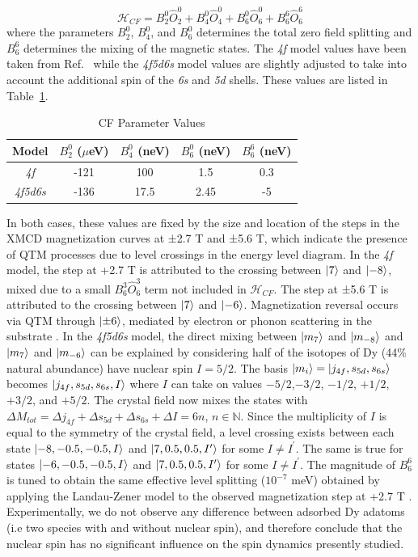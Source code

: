 \documentclass[reprint,amsmath,amssymb,aps,nofootinbib,onecolumn]{revtex4-2}
\begin{document}
\begin{equation}
\mathcal{H}_{CF} = B^{0}_{2} \hat{O}^{0}_{2} + B^{0}_{4} \hat{O}^{0}_{4} + B^{0}_{6} \hat{O}^{0}_{6} + B^{6}_{6} \hat{O}^{6}_{6}
\label{eqSI:H_CF}
\end{equation}
where the parameters $B^{0}_{2}$, $B^{0}_{4}$, and $B^{0}_{6}$ determines the total zero field splitting and $B^{6}_{6}$ determines the mixing of the magnetic states. The \textit{4f} model values have been taken from Ref.~\cite{baltic2018} while the \textit{4f5d6s} model values are slightly adjusted to take into account the additional spin of the \textit{6s} and \textit{5d} shells. These values are listed in Table~\ref{table:CF}.
\begin{table}[h!]
\centering
 \begin{tabular}{|c||c|c|c|c|}
 \hline
 Model & $B^{0}_{2}$ ($\mu$eV) & $B^{0}_{4}$ (neV) & $B^{0}_{6}$ (neV) & $B^{6}_{6}$ (neV) 
 \\ [1ex] 
 \hline 
 \hline 
 \textit{4f} & -121 & 100 & 1.5 & 0.3 \\
 \hline
  \textit{4f5d6s} & -136 & 17.5 & 2.45 & -5 \\
 \hline
 \end{tabular}
 \caption{CF Parameter Values}
 \label{table:CF}
\end{table}
In both cases, these values are fixed by the size and location of the steps in the XMCD magnetization curves at ±2.7 T and ±5.6 T, which indicate the presence of QTM processes due to level crossings in the energy level diagram. In the \textit{4f} model, the step at +2.7 T is attributed to the crossing between $\ket{7}$ and $\ket{-8}$, mixed due to a small $B^{3}_{6} \hat{O}^{3}_{6}$ term not included in $\mathcal{H}_{CF}$. The step at ±5.6 T is attributed to the crossing between $\ket{7}$ and $\ket{-6}$. Magnetization reversal occurs via QTM through $\ket{\pm 6}$, mediated by electron or phonon scattering in the substrate \cite{baltic2018,baltic2016}. In the \textit{4f5d6s} model, the direct mixing between $\ket{m_7}$ and $\ket{m_{-8}}$ and $\ket{m_7}$ and $\ket{m_{-6}}$ can be explained by considering half of the isotopes of Dy (44$\%$ natural abundance) have nuclear spin $I = 5/2$. The basis $\ket{m_i}=\ket{j_{4f},s_{5d},s_{6s}}$ becomes $\ket{j_{4f},s_{5d},s_{6s},I}$ where $I$ can take on values $-5/2$,$-3/2$, $-1/2$, $+1/2$, $+3/2$, and $+5/2$. The crystal field now mixes the states with $\Delta M_{tot}=\Delta j_{4f} + \Delta s_{5d} + \Delta s_{6s} + \Delta I=6n$, $n\in \mathbb{N}$. Since the multiplicity of $I$ is equal to the symmetry of the crystal field, a level crossing exists between each state $\ket{-8,-0.5,-0.5,I}$ and $\ket{7,0.5,0.5,I^\prime}$ for some $I \ne I^\prime$. The same is true for states $\ket{-6,-0.5,-0.5,I}$ and $\ket{7,0.5,0.5,I^\prime}$ for some $I \ne I^\prime$. The magnitude of $B^{6}_{6}$ is tuned to obtain the same effective level splitting ($10^{-7}$ meV) obtained by applying the Landau-Zener model to the observed magnetization step at +2.7 T \cite{baltic2016, zener1932}. Experimentally, we do not observe any difference between adsorbed Dy adatoms (i.e two species with and without nuclear spin), and therefore conclude that the nuclear spin has no significant influence on the spin dynamics presently studied. \par
\end{document}

